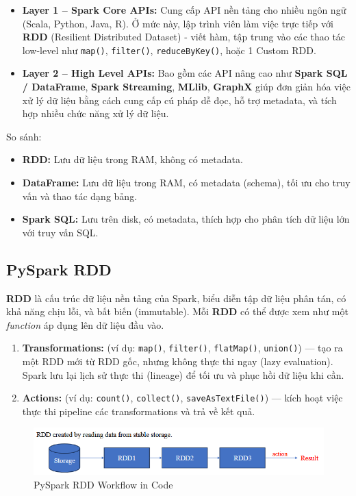 \documentclass[11pt]{article}
\begin{document}
\begin{itemize}
    \item \textbf{Layer 1 -- Spark Core APIs:} Cung cấp API nền tảng cho nhiều ngôn ngữ (Scala, Python, Java, R). Ở mức này, lập trình viên làm việc trực tiếp với \textbf{RDD} (Resilient Distributed Dataset) - viết hàm, tập trung vào các thao tác low-level như \texttt{map()}, \texttt{filter()}, \texttt{reduceByKey()}, hoặc 1 Custom RDD.
    \item \textbf{Layer 2 -- High Level APIs:} Bao gồm các API nâng cao như \textbf{Spark SQL / DataFrame}, \textbf{Spark Streaming}, \textbf{MLlib}, \textbf{GraphX} giúp đơn giản hóa việc xử lý dữ liệu bằng cách cung cấp cú pháp dễ đọc, hỗ trợ metadata, và tích hợp nhiều chức năng xử lý dữ liệu.
\end{itemize}
So sánh:
\begin{itemize}
    \item \textbf{RDD:} Lưu dữ liệu trong RAM, không có metadata.
    \item \textbf{DataFrame:} Lưu dữ liệu trong RAM, có metadata (schema), tối ưu cho truy vấn và thao tác dạng bảng.
    \item \textbf{Spark SQL:} Lưu trên disk, có metadata, thích hợp cho phân tích dữ liệu lớn với truy vấn SQL.
\end{itemize}


\subsection{PySpark RDD}
\textbf{RDD} là cấu trúc dữ liệu nền tảng của Spark, biểu diễn tập dữ liệu phân tán, có khả năng chịu lỗi, và bất biến (immutable). Mỗi \textbf{RDD} có thể được xem như một \textit{function} áp dụng lên dữ liệu đầu vào.
\begin{enumerate}
    \item \textbf{Transformations:} (ví dụ: \texttt{map()}, \texttt{filter()}, \texttt{flatMap()}, \texttt{union()}) — tạo ra một RDD mới từ RDD gốc, nhưng không thực thi ngay (lazy evaluation). Spark lưu lại lịch sử thực thi (lineage) để tối ưu và phục hồi dữ liệu khi cần.
    \item \textbf{Actions:} (ví dụ: \texttt{count()}, \texttt{collect()}, \texttt{saveAsTextFile()}) — kích hoạt việc thực thi pipeline các transformations và trả về kết quả.
\end{enumerate}

\begin{figure}[H]
    \centering
    \includegraphics[width=0.7\linewidth]{images/pysparkRDD_code.png}
    \caption{PySpark RDD Workflow in Code}
\end{figure}
\end{document}
